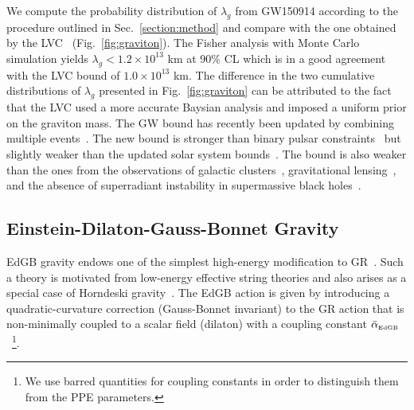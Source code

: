 \documentclass[prd,twocolumn,nofootinbib]{revtex4-1}
\newcommand{\EDGB}{{\mbox{\tiny EdGB}}}
\begin{document}
We compute the probability distribution of $\lambda_g$ from GW150914 according to the procedure outlined in Sec.~\ref{section:method} and compare with the one obtained by the LVC~\cite{TheLIGOScientific:2016src} (Fig.~\ref{fig:graviton}). The Fisher analysis with Monte Carlo simulation yields $\lambda_g<1.2\times 10^{13}$ km at 90\% CL which is in a good agreement with the LVC bound of $1.0\times10^{13}$ km. The difference in the two cumulative distributions of $\lambda_g$ presented in Fig.~\ref{fig:graviton} can be attributed to the fact that the LVC used a more accurate Baysian analysis and imposed a uniform prior on the graviton mass.
The GW bound has recently been updated by combining multiple events~\cite{LIGOScientific:2019fpa}. The new bound is stronger than binary pulsar constraints~\cite{Finn:2001qi,Miao:2019nhf} but slightly weaker than the updated solar system bounds~\cite{Will:2018gku}. The bound is also weaker than the ones from the observations of galactic clusters~\cite{Goldhaber:1974wg}, gravitational lensing~\cite{Choudhury:2002pu}, and the absence of superradiant instability in supermassive black holes~\cite{Brito:2013wya}.

\subsection{Einstein-Dilaton-Gauss-Bonnet Gravity}
EdGB gravity endows one of the simplest high-energy modification to GR~\cite{Moura:2006pz,Pani:2009wy}. Such a theory is motivated from low-energy effective string theories and also arises as a special case of Horndeski gravity~\cite{Zhang:2017unx,Berti:2015itd}. 
The EdGB action is given by introducing a quadratic-curvature correction (Gauss-Bonnet invariant) to the GR action that is non-minimally coupled to a scalar field (dilaton) with a coupling constant $\bar{\alpha}_\EDGB$~\cite{Kanti:1995vq}\footnote{We use barred quantities for coupling constants in order to distinguish them from the PPE parameters.}.
\end{document}
